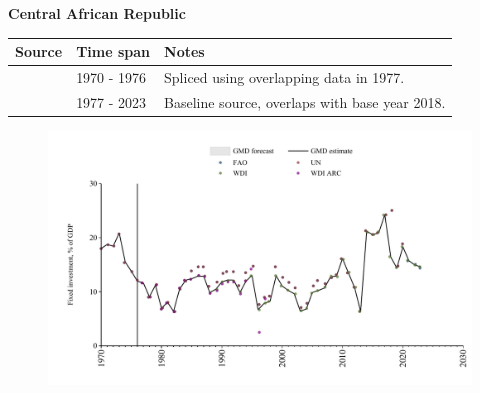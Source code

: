 \documentclass[12pt,a4paper,landscape]{article}
\begin{document}
\begin{adjustbox}{max totalsize={\paperwidth}{\paperheight},center}
\begin{minipage}[t][\textheight][t]{\textwidth}
\vspace*{0.5cm}
{}
\begin{center}
{\Large\bfseries Central African Republic}
\end{center}
\vspace{0.5cm}
\begin{table}[H]
\centering
\small
\begin{tabular}{|l|l|l|}
\hline
\textbf{Source} & \textbf{Time span} & \textbf{Notes} \\
\hline
\rowcolor{white}\cite{UN}& 1970 - 1976 &Spliced using overlapping data in 1977.\\
\rowcolor{lightgray}\cite{WDI}& 1977 - 2023 &Baseline source, overlaps with base year 2018.\\
\hline
\end{tabular}
\end{table}
\begin{figure}[H]
\centering
\includegraphics[width=\textwidth,height=0.6\textheight,keepaspectratio]{graphs/CAF_finv_GDP.pdf}
\end{figure}
\end{minipage}
\end{adjustbox}
\end{document}
